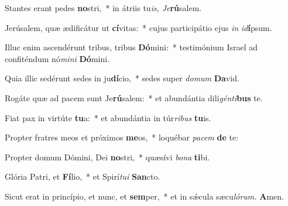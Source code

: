 \item Stantes erant pedes \textbf{no}stri,~* in átriis tu\textit{is,} \textit{Je}\textbf{rú}salem.
\item Jerúsalem, quæ ædificátur ut \textbf{cí}vitas:~* cujus participátio ejus \textit{in} \textit{id}\textbf{í}psum.
\item Illuc enim ascendérunt tribus, tribus \textbf{Dó}mini:~* testimónium Israel ad confiténdum nó\textit{mini} \textbf{Dó}mini.
\item Quia illic sedérunt sedes in ju\textbf{dí}cio,~* sedes super \textit{domum} \textbf{Da}vid.
\item Rogáte quæ ad pacem sunt Je\textbf{rú}salem:~* et abundántia dili\textit{génti}\textbf{bus} te.
\item Fiat pax in virtúte \textbf{tu}a:~* et abundántia in túr\textit{ribus} \textbf{tu}is.
\item Propter fratres meos et próximos \textbf{me}os,~* loquébar \textit{pacem} \textbf{de} te:
\item Propter domum Dómini, Dei \textbf{no}stri,~* quæsívi \textit{bona} \textbf{ti}bi.
\item Glória Patri, et \textbf{Fí}lio,~* et Spirí\hspace{0.03em}\textit{tui} \textbf{San}cto.
\item Sicut erat in princípio, et nunc, et \textbf{sem}per,~* et in sǽcula sæcu\hspace{0.03em}\textit{lórum.} \textbf{A}men.
